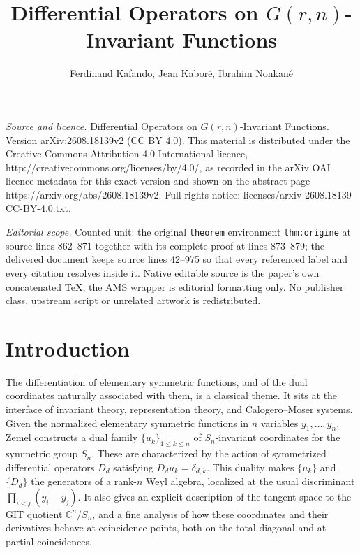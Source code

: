 \documentclass[10pt,a4paper]{amsart}
\newcommand{\CC}{\mathbb{C}}
\begin{document}
\title[Differential Operators on G(r,n)-Invariant Functions]{Differential Operators on $G(r,n)$-Invariant Functions}
\author{Ferdinand Kafando, Jean Kaboré, Ibrahim Nonkané}
\date{}
\maketitle
\noindent\emph{Source and licence.} Differential Operators on $G(r,n)$-Invariant Functions. Version arXiv:2608.18139v2 (CC BY 4.0). This material is distributed under the Creative Commons Attribution 4.0 International licence, http://creativecommons.org/licenses/by/4.0/, as recorded in the arXiv OAI licence metadata for this exact version and shown on the abstract page https://arxiv.org/abs/2608.18139v2. Full rights notice: licenses/arxiv-2608.18139-CC-BY-4.0.txt.\par\smallskip
\noindent\textit{Editorial scope.} Counted unit: the original \texttt{theorem} environment \texttt{thm:origine} at source lines 862--871 together with its complete proof at lines 873--879; the delivered document keeps source lines 42--975 so that every referenced label and every citation resolves inside it. Native editable source is the paper's own concatenated TeX; the AMS wrapper is editorial formatting only. No publisher class, upstream script or unrelated artwork is redistributed.
\section{Introduction}\label{sec:intro}

The differentiation of elementary symmetric functions, and of the dual coordinates naturally associated with them, is a classical theme. It sits at the interface of invariant theory, representation theory, and Calogero--Moser systems. Given the normalized elementary symmetric functions in $n$ variables $y_1,\dots,y_n$, Zemel \cite{Ze} constructs a dual family $\{u_k\}_{1\le k\le n}$ of $S_n$-invariant coordinates for the symmetric group $S_n$. These are characterized by the action of symmetrized differential operators $D_d$ satisfying $D_du_k=\delta_{d,k}$. This duality makes $\{u_k\}$ and $\{D_d\}$ the generators of a rank-$n$ Weyl algebra, localized at the usual discriminant $\prod_{i<j}(y_i-y_j)$. It also gives an explicit description of the tangent space to the GIT quotient $\CC^n/S_n$, and a fine analysis of how these coordinates and their derivatives behave at coincidence points, both on the total diagonal and at partial coincidences.
\end{document}
